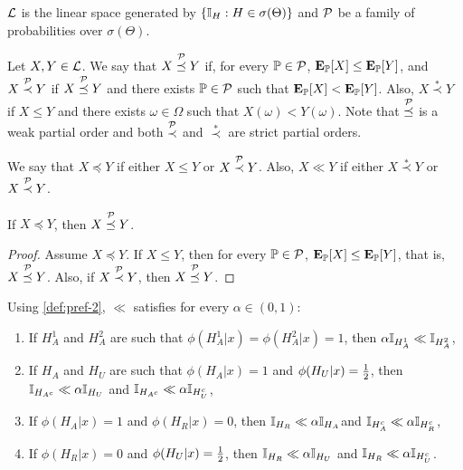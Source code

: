 \begin{definition}
  \label{def:pref-0}
 $\mathcal{L}$ is the linear space generated by
 $\{{\mathbb I}_H: H \in \sigma(\Theta)\}$ and
 $\mathcal{P}$ be a family of probabilities over $\sigma(\Theta)$.
\end{definition}

\begin{definition}
 \label{def:pref-1}
 Let $X, Y \in \mathcal{L}$.
 We say that $X \stackrel{\mathcal{P}}{\preceq} Y$ if,
 for every ${\mathbb P} \in \mathcal{P}$,
 ${\textbf{E}}_{{\mathbb P}}[X] \leq {\textbf{E}}_{{\mathbb P}}[Y]$, and
 $X \stackrel{\mathcal{P}}{\prec} Y$ if
 $X \stackrel{\mathcal{P}}{\preceq} Y$ and
 there exists ${\mathbb P} \in \mathcal{P}$ such that
 ${\textbf{E}}_{{\mathbb P}}[X] < {\textbf{E}}_{{\mathbb P}}[Y]$.
 Also, $X \stackrel{*}{\prec} Y$ if
 $X \leq Y$ and there exists $\omega \in \Omega$
 such that $X(\omega) < Y(\omega)$.
 Note that $\stackrel{\mathcal{P}}{\preceq}$ is 
 a weak partial order and
 both $\stackrel{\mathcal{P}}{\prec}$ and
 $\stackrel{*}{\prec}$ are 
 strict partial orders.
\end{definition}

\begin{definition}
 \label{def:pref-2}
 We say that $X \preceq Y$ if either
 $X \leq Y$ or $X \stackrel{\mathcal{P}}{\prec} Y$.
 Also, $X \ll Y$ if either
 $X \stackrel{*}{\prec} Y$ or $X \stackrel{\mathcal{P}}{\prec} Y$.
\end{definition}

\begin{lemma}
 \label{lemma:prec_e}
 If $X \preceq Y$, then $X \stackrel{\mathcal{P}}{\preceq} Y$.
\end{lemma}

\begin{proof}
 Assume $X \preceq Y$. If $X \leq Y$, then for every ${\mathbb P} \in \mathcal{P}$, ${\textbf{E}}_{{\mathbb P}}[X] \leq {\textbf{E}}_{{\mathbb P}}[Y]$, that is, $X \stackrel{\mathcal{P}}{\preceq} Y$. Also, if $X \stackrel{\mathcal{P}}{\prec} Y$, then $X \stackrel{\mathcal{P}}{\preceq} Y$.
\end{proof}

\begin{lemma}
 \label{lemma:prec_analogous} 
 Using \cref{def:pref-2}, $\ll$ satisfies for every $\alpha \in (0,1)$:
 \begin{enumerate}
  \item If $H_A^1$ and $H_A^2$ are such that $\phi(H_A^1|x) = \phi(H_A^2|x) = 1$, then $\alpha{\mathbb I}_{H_A^1} \ll {\mathbb I}_{H_A^2}$,
  \item If $H_A$ and $H_U$ are such that $\phi(H_A|x) = 1$ and $\phi(H_U|x) = \frac{1}{2}$, then ${\mathbb I}_{H_{A^c}} 
 \ll \alpha {\mathbb I}_{H_U}$ and ${\mathbb I}_{H_{A^c}} \ll \alpha {\mathbb I}_{H_U^c}$,
  \item If $\phi(H_A|x) = 1$ and $\phi(H_R|x) = 0$, then ${\mathbb I}_{H_R} \ll \alpha {\mathbb I}_{H_A}$and ${\mathbb I}_{H_A^c} \ll \alpha {\mathbb I}_{H_R^c}$,
  \item If $\phi(H_R|x) = 0$ and $\phi(H_U|x) = \frac{1}{2}$, then ${\mathbb I}_{H_R} \ll \alpha {\mathbb I}_{H_U}$ and ${\mathbb I}_{H_R} \ll \alpha {\mathbb I}_{H_U^c}$. 
 \end{enumerate}
\end{lemma}

